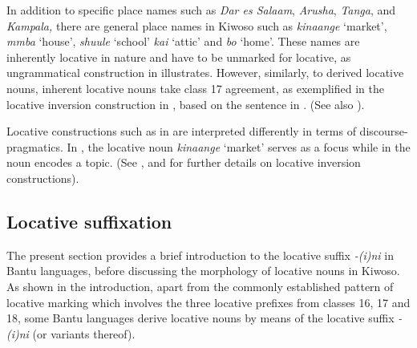 \documentclass[output=paper]{langscibook}
\begin{document}
In addition to specific place names such as \textit{Dar es Salaam}, \textit{Arusha}, \textit{Tanga}, and \textit{Kampala,} there are general place names in Kiwoso such as \textit{kinaange} ‘market’, \textit{mmba} ‘house’, \textit{shuule} ‘school’ \textit{kai} ‘attic’ and \textit{bo} ‘home’. These names are inherently locative in nature and have to be unmarked for locative, as ungrammatical construction in  illustrates. However, similarly, to derived locative nouns, inherent locative nouns take class 17 agreement, as exemplified in the locative inversion construction in , based on the sentence in . (See also ).

\ea\label{ex:mallya:4}


      \z
\z

Locative constructions such as in  are interpreted differently in terms of discourse-pragmatics. In , the locative noun \textit{kinaange} ‘market’ serves as a focus while in  the noun encodes a topic. (See \citealt{MartenGibson2016}, \citealt{MartenvanderWal2014} and \citealt{Mallya2020} for further details on locative inversion constructions). 

\subsection{Locative suffixation}
\label{sec:mallya:4.2}

The present section provides a brief introduction to the locative suffix \textit{{}-(i)ni} in Bantu languages, before discussing the morphology of locative nouns in Kiwoso. As shown in the introduction, apart from the commonly established pattern of locative marking which involves the three locative prefixes from classes 16, 17 and 18, some Bantu languages derive locative nouns by means of the locative suffix \textit{{}-(i)ni} (or variants thereof).
\end{document}
